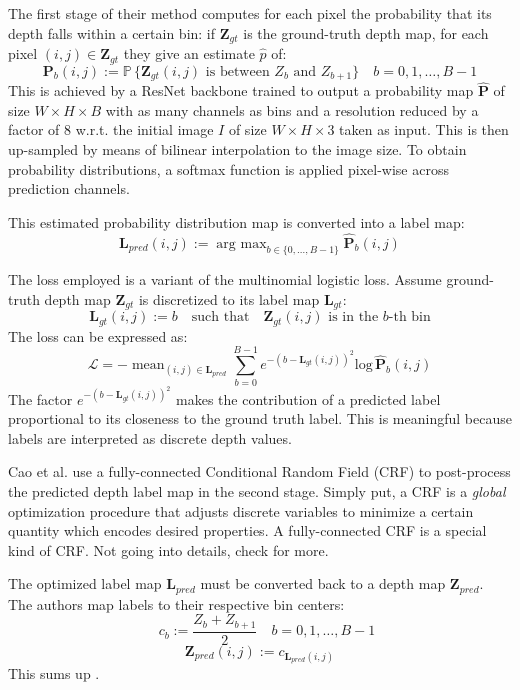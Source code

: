 The first stage of their method computes for each pixel the probability that its depth falls within a certain bin: if $\mathbf{Z}_{gt}$ is the ground-truth depth map, for each pixel $(i,j) \in \mathbf{Z}_{gt}$ they give an estimate $\hat{p}$ of:
\[
	\mathbf{P}_{b}(i,j) := \mathbb{P} \, \{\mathbf{Z}_{gt}(i,j) \text{ is between } Z_{b} \text{ and } Z_{b+1}\} \quad b = 0, 1, \dotsc, B-1
\]
This is achieved by a ResNet \cite{ResNet} backbone trained to output a probability map $\hat{\mathbf{P}}$ of size $W \times H \times B$ with as many channels as bins and a resolution reduced by a factor of 8 w.r.t. the initial image $I$ of size $W \times H \times 3$ taken as input.
This is then up-sampled by means of bilinear interpolation to the image size.
To obtain probability distributions, a softmax function is applied pixel-wise across prediction channels.

This estimated probability distribution map is converted into a label map:
\[
	\mathbf{L}_{pred}(i, j) := \mathop{\text{arg max}}_{b \in \{ 0, \dotsc, B-1\}} \hat{\mathbf{P}}_{b}(i, j)
\]

The loss employed is a variant of the multinomial logistic loss.
Assume ground-truth depth map $\mathbf{Z}_{gt}$ is discretized to its label map $\mathbf{L}_{gt}$:
\[
	\mathbf{L}_{gt}(i,j) := b	\quad \text{such that} \quad \mathbf{Z}_{gt}(i,j) \text{ is in the } b\text{-th bin}
\]
The loss can be expressed as:
\[
	\mathcal{L} =
		- \mathop{\text{mean}}_{(i,j) \in \mathbf{L}_{pred}}
		\sum_{b = 0}^{B-1}
		e^{-(b - \mathbf{L}_{gt}(i,j))^{2}}
		\text{log} \, \hat{\mathbf{P}}_{b}(i,j)
\]
The factor $e^{-(b - \mathbf{L}_{gt}(i,j))^{2}}$ makes the contribution of a predicted label proportional to its closeness to the ground truth label.
This is meaningful because labels are interpreted as discrete depth values.

Cao et al. use a fully-connected Conditional Random Field (CRF) to post-process the predicted depth label map in the second stage.
Simply put, a CRF is a \textit{global} optimization procedure that adjusts discrete variables to minimize a certain quantity which encodes desired properties.
A fully-connected CRF is a special kind of CRF.
Not going into details, check \cite{computer_vision} for more.

The optimized label map $\mathbf{L}_{pred}$ must be converted back to a depth map $\mathbf{Z}_{pred}$.
The authors map labels to their respective bin centers:
\[
	\quad c_{b} := \frac{Z_{b} + Z_{b+1}}{2} \quad b = 0, 1, \dotsc, B-1
\]\[
	\mathbf{Z}_{pred}(i,j) := c_{\mathbf{L}_{pred}(i,j)}
\]
This sums up \cite{depth_as_classification}.

